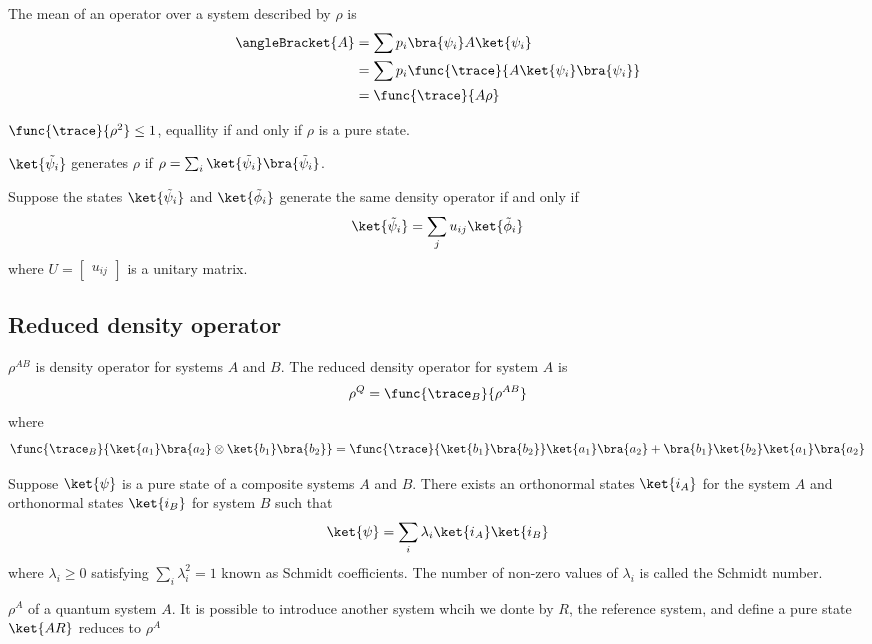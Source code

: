 The mean of an operator over a system described by \(\rho\) is 
\begin{align*}
    \angleBracket{A} &= \sum p_i \bra{\psi_i} A \ket{\psi_i} \\
    &= \sum p_i \func{\trace}{A \ket{\psi_i} \bra{\psi_i}}\\
    &= \func{\trace}{A \rho}
\end{align*}

\begin{theorem}
    \(\func{\trace}{\rho^2} \leq 1\), equallity if and only if \(\rho\) is a pure state.
\end{theorem}
\(\ket{\tilde{\psi_i}}\) generates \(\rho\) if \(\rho = \sum_{i} \ket{\tilde{\psi_i}} \bra{\tilde{\psi}_i}\).
\begin{theorem}
    Suppose the states \(\ket{\tilde{\psi}_i}\) and \(\ket{\tilde{\phi}_i}\) generate the same density operator if and only if 
    \begin{equation*}
        \ket{\tilde{\psi}_i} = \sum_{j} u_{ij} \ket{\tilde{\phi}_i}
    \end{equation*}
    where \(U = \begin{bmatrix}
        u_{ij}
    \end{bmatrix}\) is a unitary matrix.
\end{theorem}
 \subsection{Reduced density operator}
 \(\rho^{AB}\) is  density operator for systems \(A\) and \(B\). The reduced density operator for system \(A\) is 
 \begin{equation*}
    \rho^Q = \func{\trace_B}{\rho^{AB}}
 \end{equation*}
 where 
 \begin{equation*}
    \func{\trace_B}{\ket{a_1}\bra{a_2} \otimes \ket{b_1}\bra{b_2}} = \func{\trace}{\ket{b_1}\bra{b_2}}\ket{a_1}\bra{a_2} + \bra{b_1}\ket{b_2}\ket{a_1}\bra{a_2} 
 \end{equation*}

 \begin{theorem}
    Suppose \(\ket{\psi}\) is a pure state of a composite systems \(A\) and \(B\). There exists an orthonormal states \(\ket{i_A}\) for the system \(A\) and orthonormal states \(\ket{i_B}\) for system \(B\) such that 
    \begin{equation*}
        \ket{\psi} = \sum_i \lambda_i \ket{i_A} \ket{i_B}
    \end{equation*}
    where \(\lambda_i \geq 0\) satisfying \(\sum_i \lambda_i^2 = 1\) known as Schmidt coefficients. The number of non-zero values of \(\lambda_i\) is called the Schmidt number.
 \end{theorem}
 \begin{definition}[Purifiction]
    \(\rho^A\) of a quantum system \(A\). It is possible to introduce another system whcih we donte by \(R\), the reference system, and define a pure state \(\ket{AR}\) reduces to \(\rho^A\)
 \end{definition}

